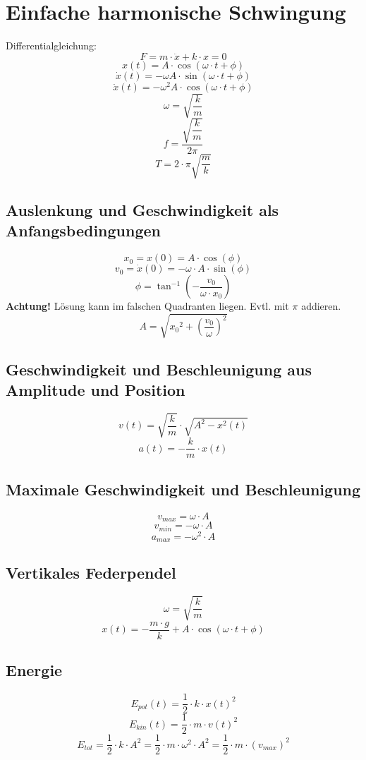 \section{Einfache harmonische Schwingung}
Differentialgleichung: 
\[ \boxed{F = m \cdot \ddot{x} + k \cdot x = 0} \]
\[ \boxed{x(t) = A \cdot \cos(\omega \cdot t + \phi)} \]
\[ \boxed{\dot{x}(t) = - \omega A \cdot \sin(\omega \cdot t + \phi)} \]
\[ \boxed{\ddot{x}(t) = - \omega^2 A \cdot \cos(\omega \cdot t + \phi)} \]
\[ \boxed{\omega = \sqrt{\frac{k}{m}}} \]
\[ \boxed{f = \frac{\sqrt{\dfrac{k}{m}}}{2 \pi}} \]
\[ \boxed{T = 2 \cdot \pi \sqrt{\frac{m}{k}}} \]

\subsection{Auslenkung und Geschwindigkeit als Anfangsbedingungen}
\[ \boxed{x_0 = x(0) = A \cdot \cos(\phi)} \]
\[ \boxed{v_0 = \dot{x}(0) = - \omega \cdot A \cdot \sin(\phi)} \]
\[ \boxed{\phi = \tan^{-1}\left(-\frac{v_0}{\omega \cdot x_0}\right)} \]
\textbf{Achtung!} Lösung kann im falschen Quadranten liegen. 
Evtl. mit $\pi$ addieren. 
\[ \boxed{A = \sqrt{{x_0}^2 + \left(\frac{v_0}{\omega}\right)^2}} \]

\subsection{Geschwindigkeit und Beschleunigung aus Amplitude und Position}
\[ \boxed{v(t) = \sqrt{\frac{k}{m}} \cdot \sqrt{A^2 - x^2(t)}} \]
\[ \boxed{a(t) = - \frac{k}{m} \cdot x(t)} \]

\subsection{Maximale Geschwindigkeit und Beschleunigung}
\[ \boxed{v_{max} = \omega \cdot A} \]
\[ \boxed{v_{min} = -\omega \cdot A} \]
\[ \boxed{a_{max} = -\omega^2 \cdot A} \]

\subsection{Vertikales Federpendel}
\[ \boxed{\omega = \sqrt{\frac{k}{m}}} \]
\[ \boxed{x(t) = - \frac{m \cdot g}{k} + A \cdot \cos(\omega \cdot t + \phi)} \]

\subsection{Energie}
\[ \boxed{E_{pot}(t) = \frac{1}{2} \cdot k \cdot x(t)^2} \]
\[ \boxed{E_{kin}(t) = \frac{1}{2} \cdot m \cdot v(t)^2} \]
\[ \boxed{E_{tot} = \frac{1}{2} \cdot k \cdot A^2 
= \frac{1}{2} \cdot m \cdot \omega^2 \cdot A^2 
= \frac{1}{2} \cdot m \cdot (v_{max})^2} \]

